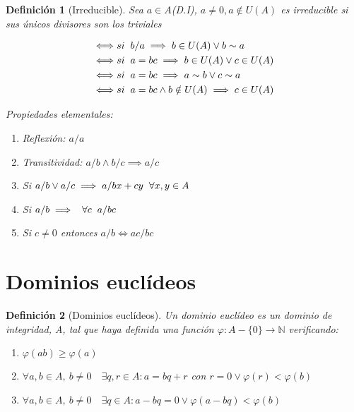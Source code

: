 \documentclass[11pt, a4paper, titlepage]{article}
\theoremstyle{theorem-style}
\theoremstyle{definition-style}
\newtheorem*{ndef}{Definición}
\theoremstyle{remark-style}
\theoremstyle{example-style}
\newenvironment{nlist}
{\begin{enumerate}
\renewcommand\labelenumi{(\emph{\roman{enumi})}}}
{\end{enumerate}}
\begin{document}
\begin{ndef}[Irreducible]
	
	Sea $a\in A$(D.I), $a\neq 0, a \notin U(A)$ es irreducible si sus únicos divisores son los triviales

\begin{align}
	\iff& si\hspace{0.2cm} b/a \implies b\in U(A) \vee b \sim a
\\
	\iff& si \hspace{0.2cm} a=bc \implies b\in U(A) \vee c \in U(A)
\\
	\iff& si \hspace{0.2cm} a=bc \implies a\sim b \vee c \sim a
\\
	\iff& si \hspace{0.2cm}a=bc \wedge b \notin U(A) \implies c \in U(A)
\end{align}
	
Propiedades elementales:
\begin{nlist}
	\item Reflexión: $a/a$
	\item Transitividad: $a/b \wedge b/c \implies a/c$
	\item Si $a/b \vee a/c \implies a/bx +cy\hspace{0.2cm} \forall x,y \in A$ 
	\item Si $a/b \implies \hspace{0.2cm} \forall c \hspace{0.2cm} a/bc$
	\item Si $c\neq 0$ entonces $a/b \iff ac/bc$
\end{nlist}
\end{ndef}

\section{Dominios euclídeos}
\begin{ndef}[Dominios euclídeos]

	Un dominio euclídeo es un dominio de integridad, A, tal que haya definida una función $\varphi: A- \{0\} \to \mathbb{N} $ verificando:

\begin{nlist}
	\item $\varphi(ab) \ge \varphi(a)$
	\item $\forall a,b \in A,\ b \neq 0 \quad \exists q,r \in A : a = bq + r $ con $r=0 \vee \varphi(r) < \varphi(b)$
	\item $\forall a,b \in A,\ b \neq 0 \quad \exists q \in A : a - bq = 0 \vee  \varphi(a-bq) < \varphi(b)$
\end{nlist}	
\end{ndef}
\end{document}
